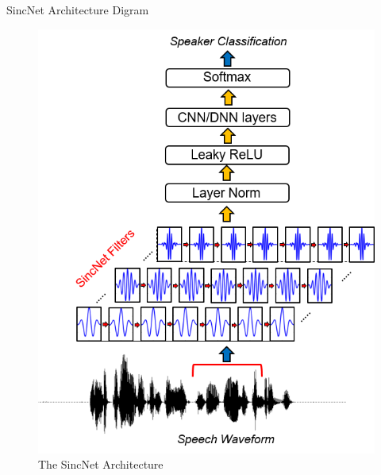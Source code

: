 \documentclass[11pt]{beamer}
\begin{document}
\begin{frame}{SincNet Architecture Digram}
	\begin{figure}[H]
		\includegraphics[width=0.4\linewidth]{images/SincNet.png}
		\caption{The SincNet Architecture}
		\label{fig:writing-thesis}
	\end{figure}
\end{frame}
\end{document}
